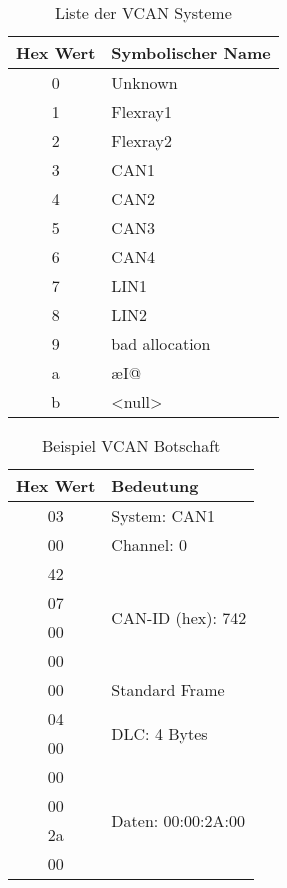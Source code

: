 \begin{table}[ht]
    \center
    \begin{tabular}[h]{c l}
        Hex Wert & Symbolischer Name \\
        \toprule
        0 & Unknown\\
        1 & Flexray1\\
        2 & Flexray2\\
        3 & CAN1\\
        4 & CAN2\\
        5 & CAN3\\
        6 & CAN4\\
        7 & LIN1\\
        8 & LIN2\\
        9 & bad allocation\\
        a & æI@\\
        b & <null>\\
        \bottomrule
    \end{tabular}
    \caption{Liste der VCAN Systeme}
    \label{tab:vcansysteme}
\end{table}

\begin{table}[ht]
    \center
    \begin{tabular}[h]{c l}
        Hex Wert & Bedeutung \\
        \toprule
        03 & System: CAN1\\
        \midrule
        00 & Channel: 0\\
        \midrule
        42 & \multirow{4}{*}{CAN-ID (hex): 742}\\
        07 & \\
        00 & \\
        00 & \\
        \midrule
        00 & Standard Frame\\
        \midrule
        04 & \multirow{2}{*}{DLC: 4 Bytes}\\
        00 & \\
        \midrule
        00 & \multirow{4}{*}{Daten: 00:00:2A:00}\\
        00 & \\
        2a & \\
        00 & \\
        \bottomrule
    \end{tabular}
    \caption{Beispiel VCAN Botschaft}
    \label{tab:vcanbotschaft}
\end{table}

